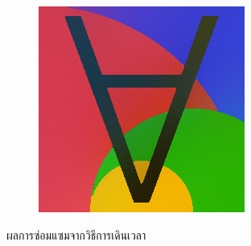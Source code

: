 \begin{figure}[H]
\begin{subfigure}{0.4\linewidth}
        \includegraphics[width=0.8\linewidth]{image/result_ex1/timemarch05.png}			
    \end{subfigure}
    \caption{ผลการซ่อมแซมจากวิธีการเดินเวลา}
    \label{result:image-timemarching}
\end{figure}

